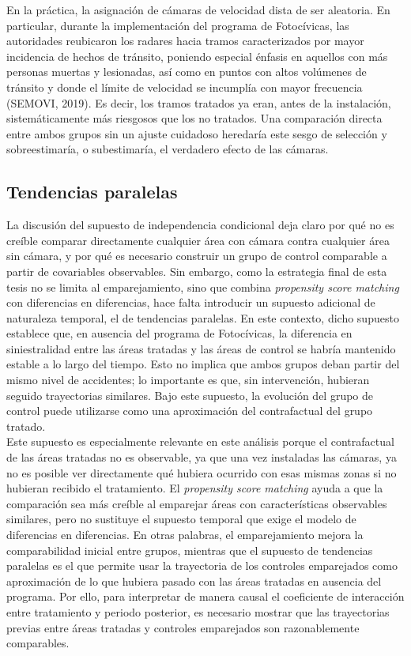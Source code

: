 En la práctica, la asignación de cámaras de velocidad dista de ser aleatoria. En particular, durante la implementación del programa de Fotocívicas, las autoridades reubicaron los radares hacia tramos caracterizados por mayor incidencia de hechos de tránsito, poniendo especial énfasis en aquellos con más personas muertas y lesionadas, así como en puntos con altos volúmenes de tránsito y donde el límite de velocidad se incumplía con mayor frecuencia (SEMOVI, 2019). Es decir, los tramos tratados ya eran, antes de la instalación, sistemáticamente más riesgosos que los no tratados. Una comparación directa entre ambos grupos sin un ajuste cuidadoso heredaría este sesgo de selección y sobreestimaría, o subestimaría, el verdadero efecto de las cámaras.\\

\subsection{Tendencias paralelas}
\noindent La discusión del supuesto de independencia condicional deja claro por qué no es creíble comparar directamente cualquier área con cámara contra cualquier área sin cámara, y por qué es necesario construir un grupo de control comparable a partir de covariables observables. Sin embargo, como la estrategia final de esta tesis no se limita al emparejamiento, sino que combina \emph{propensity score matching} con diferencias en diferencias, hace falta introducir un supuesto adicional de naturaleza temporal, el de tendencias paralelas. En este contexto, dicho supuesto establece que, en ausencia del programa de Fotocívicas, la diferencia en siniestralidad entre las áreas tratadas y las áreas de control se habría mantenido estable a lo largo del tiempo. Esto no implica que ambos grupos deban partir del mismo nivel de accidentes; lo importante es que, sin intervención, hubieran seguido trayectorias similares. Bajo este supuesto, la evolución del grupo de control puede utilizarse como una aproximación del contrafactual del grupo tratado.\\

Este supuesto es especialmente relevante en este análisis porque el contrafactual de las áreas tratadas no es observable, ya que una vez instaladas las cámaras, ya no es posible ver directamente qué hubiera ocurrido con esas mismas zonas si no hubieran recibido el tratamiento. El \emph{propensity score matching} ayuda a que la comparación sea más creíble al emparejar áreas con características observables similares, pero no sustituye el supuesto temporal que exige el modelo de diferencias en diferencias. En otras palabras, el emparejamiento mejora la comparabilidad inicial entre grupos, mientras que el supuesto de tendencias paralelas es el que permite usar la trayectoria de los controles emparejados como aproximación de lo que hubiera pasado con las áreas tratadas en ausencia del programa. Por ello, para interpretar de manera causal el coeficiente de interacción entre tratamiento y periodo posterior, es necesario mostrar que las trayectorias previas entre áreas tratadas y controles emparejados son razonablemente comparables.\\

